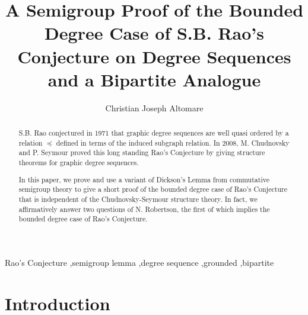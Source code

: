 \documentclass[review]{elsarticle}
\begin{document}
\newtheorem{thm}{Theorem}
\newtheorem{lem}{Lemma}
\newtheorem{cor}{Corollary}
\newtheorem{pro}{Proposition}
\newtheorem{conj}{Conjecture}


\title{A Semigroup Proof of the Bounded Degree Case of S.B. Rao's Conjecture
on Degree Sequences and a Bipartite Analogue}
\author[cja]{Christian Joseph Altomare}
\address{The Ohio State University, 231, West 18th Avenue,
Columbus, Ohio, United States}

\begin{abstract}
S.B. Rao conjectured in 1971 that graphic degree sequences are well
quasi ordered by a relation $\preceq$ defined in terms of the induced
subgraph relation\cite{rao_private}.
In 2008, M. Chudnovsky and P. Seymour proved this
long standing Rao's Conjecture by giving structure theorems for graphic
degree sequences\cite{proof_rao}.

In this paper, we prove and use a variant of Dickson's
Lemma\cite{dicksons_lemma} from
commutative semigroup theory to give
a short proof of the bounded degree case of Rao's Conjecture that is
independent of the Chudnovsky-Seymour structure theory. In fact, we
affirmatively answer two questions of N. Robertson\cite{neil_private},
the first of which implies the bounded degree case of Rao's Conjecture.
\end{abstract}

\maketitle



\begin{keyword}
Rao's Conjecture \sep semigroup lemma \sep degree sequence \sep grounded \sep bipartite
\end{keyword}

\section{Introduction}
\end{document}
